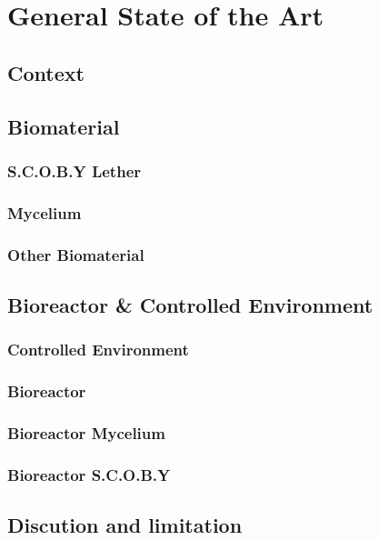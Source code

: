 \chapter{General State of the Art}


\section{Context}


\section{Biomaterial}

\subsection{S.C.O.B.Y Lether}
\subsection{Mycelium}
\subsection{Other Biomaterial}

\section{Bioreactor \& Controlled Environment }

\subsection{Controlled Environment}
\subsection{Bioreactor}
\subsection{Bioreactor Mycelium}
\subsection{Bioreactor S.C.O.B.Y}


\section{Discution and limitation}